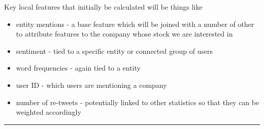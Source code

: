 \documentclass[a0]{a0poster}
\begin{document}
\begin{textblock}{7}
\sf
Key local features that initially be calculated will be things like
\begin{itemize}
\item entity mentions - a base feature which will be joined with a number of other to attribute features to the company whose stock we are interested in
\item sentiment - tied to a specific entity or connected group of users
\item word frequencies - again tied to a entity
\item user ID - which users are mentioning a company
\item number of re-tweets - potentially linked to other statistics so that they can be weighted accordingly
\end{itemize}

\bigskip
\hrule
\end{textblock}

\end{document}
